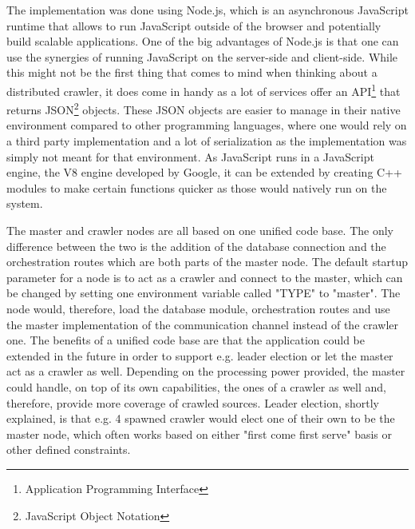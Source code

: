 The implementation was done using Node.js, which is an asynchronous JavaScript runtime that allows to run JavaScript outside of the browser and potentially build scalable applications. One of the big advantages of Node.js is that one can use the synergies of running JavaScript on the server-side and client-side. While this might not be the first thing that comes to mind when thinking about a distributed crawler, it does come in handy as a lot of services offer an API\footnote{Application Programming Interface} that returns JSON\footnote{JavaScript Object Notation} objects. These JSON objects are easier to manage in their native environment compared to other programming languages, where one would rely on a third party implementation and a lot of serialization as the implementation was simply not meant for that environment.
As JavaScript runs in a JavaScript engine, the V8 engine developed by Google, it can be extended by creating C++ modules to make certain functions quicker as those would natively run on the system.

The master and crawler nodes are all based on one unified code base. The only difference between the two is the addition of the database connection and the orchestration routes which are both parts of the master node. The default startup parameter for a node is to act as a crawler and connect to the master, which can be changed by setting one environment variable called "TYPE" to "master". The node would, therefore, load the database module, orchestration routes and use the master implementation of the communication channel instead of the crawler one.
The benefits of a unified code base are that the application could be extended in the future in order to support e.g. leader election or let the master act as a crawler as well. Depending on the processing power provided, the master could handle, on top of its own capabilities, the ones of a crawler as well and, therefore, provide more coverage of crawled sources.
Leader election, shortly explained, is that e.g. 4 spawned crawler would elect one of their own to be the master node, which often works based on either "first come first serve" basis or other defined constraints.

